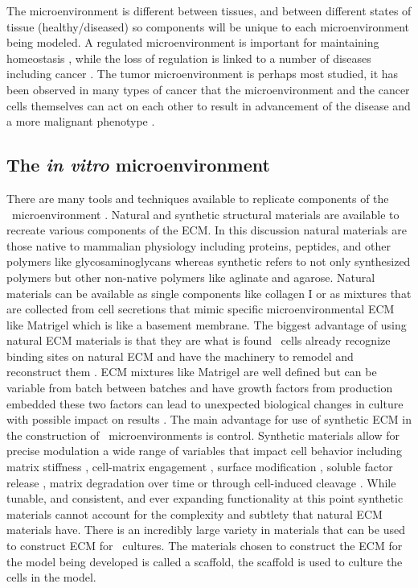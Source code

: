 The microenvironment is different between tissues, and between different states of tissue (healthy/diseased) so components will be unique to each microenvironment being modeled. A regulated microenvironment is important for maintaining homeostasis \cite{Nie2013Microenvironment-dependentRepair}, while the loss of regulation is linked to a number of diseases including cancer \cite{Malizia1985TheLymphocytes., Yip2011, medema2011microenvironmental, Charbord1996EarlyMicroenvironment., Martin1995, Nie2013Microenvironment-dependentRepair}. The tumor microenvironment is perhaps most studied, it has been observed in many types of cancer that the microenvironment and the cancer cells themselves can act on each other to result in advancement of the disease and a more malignant phenotype \cite{Meads2008, Jun2006, Shain2001CellMDR., Seo2015}.

\subsection{The \textit{in vitro} microenvironment}
There are many tools and techniques available to replicate components of the \invivo\ microenvironment \invitro. Natural and synthetic structural materials are available to recreate various components of the ECM. In this discussion natural materials are those native to mammalian physiology including proteins, peptides, and other polymers like glycosaminoglycans whereas synthetic refers to not only synthesized polymers but other non-native polymers like aglinate and agarose. Natural materials can be available as single components like collagen I or as mixtures that are collected from cell secretions that mimic specific microenvironmental ECM like Matrigel which is like a basement membrane. The biggest advantage of using natural ECM materials is that they are what is found \invivo\ cells already recognize binding sites on natural ECM and have the machinery to remodel and reconstruct them \cite{Mano2007NaturalTrends.}. ECM mixtures like Matrigel are well defined but can be variable from batch between batches and have growth factors from production embedded these two factors can lead to unexpected biological changes in culture with possible impact on results \cite{Hughes2010Matrigel:Culture.}. The main advantage for use of synthetic ECM in the construction of \invitro\ microenvironments is control. Synthetic materials allow for precise modulation a wide range of variables that impact cell behavior including matrix stiffness \cite{Peyton2008TheSystem}, cell-matrix engagement \cite{Hsiong2008Integrin-AdhesionMatrices}, surface modification \cite{Jongpaiboonkit2009GrowthMicrospheres.}, soluble factor release \cite{Belair2016DifferentialMicrospheres}, matrix degradation over time \cite{Gunatillake2003BiodegradableEngineering.} or through cell-induced cleavage \cite{Tibbitt2009HydrogelsCulture}. While tunable, and consistent, and ever expanding functionality at this point synthetic materials cannot account for the complexity and subtlety that natural ECM materials have. There is an incredibly large variety in materials that can be used to construct ECM for \invitro\ cultures. The materials chosen to construct the ECM for the model being developed is called a scaffold, the scaffold is used to culture the cells in the model. 

